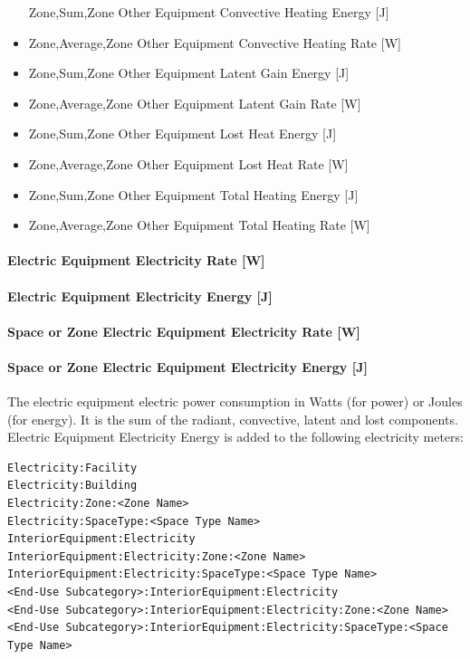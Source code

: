 \begin{itemize}
  Zone,Sum,Zone Other Equipment Convective Heating Energy {[}J{]}
\item
  Zone,Average,Zone Other Equipment Convective Heating Rate {[}W{]}
\item
  Zone,Sum,Zone Other Equipment Latent Gain Energy {[}J{]}
\item
  Zone,Average,Zone Other Equipment Latent Gain Rate {[}W{]}
\item
  Zone,Sum,Zone Other Equipment Lost Heat Energy {[}J{]}
\item
  Zone,Average,Zone Other Equipment Lost Heat Rate {[}W{]}
\item
  Zone,Sum,Zone Other Equipment Total Heating Energy {[}J{]}
\item
  Zone,Average,Zone Other Equipment Total Heating Rate {[}W{]}
\end{itemize}

\paragraph{Electric Equipment Electricity Rate {[}W{]}}\label{electric-equipment-electric-power-w}

\paragraph{Electric Equipment Electricity Energy {[}J{]}}\label{electric-equipment-electric-energy-j}

\paragraph{Space or Zone Electric Equipment Electricity Rate {[}W{]}}\label{zone-electric-equipment-electric-power-w}

\paragraph{Space or Zone Electric Equipment Electricity Energy {[}J{]}}\label{zone-electric-equipment-electric-energy-j}

The electric equipment electric power consumption in Watts (for power) or Joules (for energy). It is the sum of the radiant, convective, latent and lost components. Electric Equipment Electricity Energy is added to the following electricity meters:
\begin{lstlisting}
Electricity:Facility
Electricity:Building
Electricity:Zone:<Zone Name>
Electricity:SpaceType:<Space Type Name>
InteriorEquipment:Electricity
InteriorEquipment:Electricity:Zone:<Zone Name>
InteriorEquipment:Electricity:SpaceType:<Space Type Name>
<End-Use Subcategory>:InteriorEquipment:Electricity
<End-Use Subcategory>:InteriorEquipment:Electricity:Zone:<Zone Name>
<End-Use Subcategory>:InteriorEquipment:Electricity:SpaceType:<Space Type Name>
\end{lstlisting}

